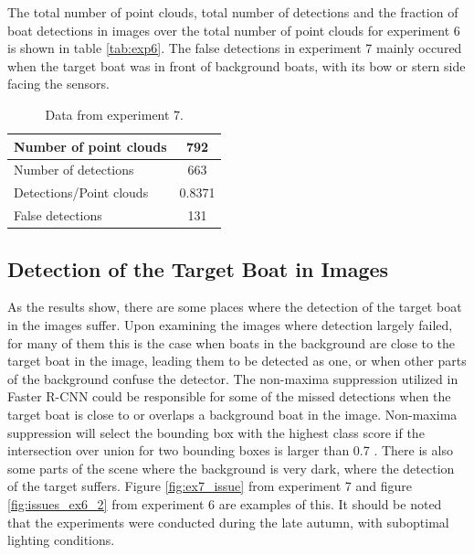 The total number of point clouds, total number of detections and the fraction of boat detections in images over the total number of point clouds for experiment 6 is shown in table \ref{tab:exp6}. The false detections in experiment 7 mainly occured when the target boat was in front of background boats, with its bow or stern side facing the sensors.
\begin{table}[H]
	\centering
	\begin{tabularx}{.7\linewidth}{L c}
		\toprule
		Number of point clouds & 792\\
		\midrule
		Number of detections & 663\\
		\midrule
		Detections/Point clouds & 0.8371 \\
		\midrule
		False detections & 131\\
		\bottomrule
	\end{tabularx}
	\caption{Data from experiment 7.}
	\label{tab:exp7}
\end{table}
\subsection{Detection of the Target Boat in Images}
As the results show, there are some places where the detection of the target boat in the images suffer. Upon examining the images where detection largely failed, for many of them this is the case when boats in the background are close to the target boat in the image, leading them to be detected as one, or when other parts of the background confuse the detector. The non-maxima suppression utilized in Faster R-CNN could be responsible for some of the missed detections when the target boat is close to or overlaps a background boat in the image. Non-maxima suppression will select the bounding box with the highest class score if the intersection over union for two bounding boxes is larger than 0.7 \cite{ren15fasterrcnn}. There is also some parts of the scene where the background is very dark, where the detection of the target suffers. Figure \ref{fig:ex7_issue} from experiment 7 and figure \ref{fig:issues_ex6_2} from experiment 6 are examples of this. It should be noted that the experiments were conducted during the late autumn, with suboptimal lighting conditions.


